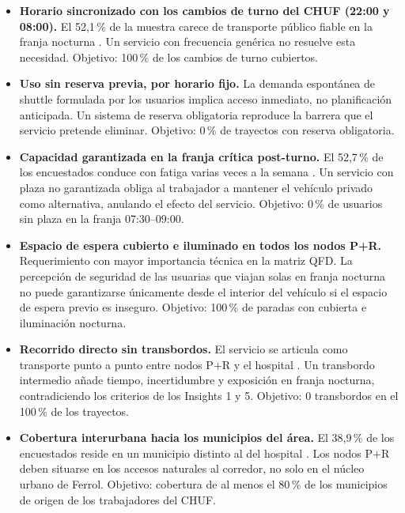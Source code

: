 \begin{itemize}

	\item \textbf{Horario sincronizado con los cambios de turno del CHUF
	(22:00 y 08:00).} El 52,1\,\% de la muestra carece de transporte
	público fiable en la franja nocturna \parencite{LouridoRegueira2026}.
	Un servicio con frecuencia genérica no resuelve esta necesidad.
	Objetivo: 100\,\% de los cambios de turno cubiertos.

	\item \textbf{Uso sin reserva previa, por horario fijo.}
	La demanda espontánea de shuttle formulada por los usuarios
	\parencite{LouridoRegueira2026} implica acceso inmediato, no
	planificación anticipada. Un sistema de reserva obligatoria
	reproduce la barrera que el servicio pretende eliminar.
	Objetivo: 0\,\% de trayectos con reserva obligatoria.

	\item \textbf{Capacidad garantizada en la franja crítica post-turno.}
	El 52,7\,\% de los encuestados conduce con fatiga varias veces a la
	semana \parencite{LouridoRegueira2026}. Un servicio con plaza no
	garantizada obliga al trabajador a mantener el vehículo privado como
	alternativa, anulando el efecto del servicio.
	Objetivo: 0\,\% de usuarios sin plaza en la franja 07:30--09:00.

	\item \textbf{Espacio de espera cubierto e iluminado en todos los
	nodos P+R.} Requerimiento con mayor importancia técnica en la
	matriz QFD. La percepción de seguridad de las usuarias que viajan
	solas en franja nocturna \parencite{LouridoRegueira2026} no puede
	garantizarse únicamente desde el interior del vehículo si el espacio
	de espera previo es inseguro.
	Objetivo: 100\,\% de paradas con cubierta e iluminación nocturna.

	\item \textbf{Recorrido directo sin transbordos.}
	El servicio se articula como transporte punto a punto entre nodos
	P+R y el hospital \parencite{LouridoRegueira2026}. Un transbordo
	intermedio añade tiempo, incertidumbre y exposición en franja
	nocturna, contradiciendo los criterios de los Insights 1 y 5.
	Objetivo: 0 transbordos en el 100\,\% de los trayectos.

	\item \textbf{Cobertura interurbana hacia los municipios del área.}
	El 38,9\,\% de los encuestados reside en un municipio distinto al
	del hospital \parencite{LouridoRegueira2026}. Los nodos P+R deben
	situarse en los accesos naturales al corredor, no solo en el núcleo
	urbano de Ferrol. Objetivo: cobertura de al menos el 80\,\% de los
	municipios de origen de los trabajadores del CHUF.

\end{itemize}

